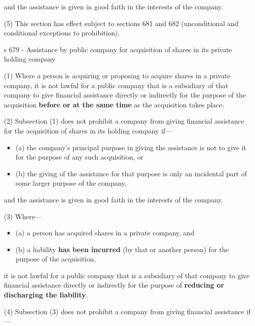 \documentclass[
]{article}
\providecommand{\tightlist}{%
  \setlength{\itemsep}{0pt}\setlength{\parskip}{0pt}}
\newenvironment{env-99ba4262-5297-4318-9547-86307715f49a}
{
    \savenotes\tcolorbox[blanker,breakable,left=5pt,borderline west={2pt}{-4pt}{green}]
}
{
    \endtcolorbox\spewnotes
}
\begin{document}
\begin{env-99ba4262-5297-4318-9547-86307715f49a}
and the assistance is given in good faith in the interests of the
company.

(5) This section has effect subject to sections 681 and 682
(unconditional and conditional exceptions to prohibition).

\end{env-99ba4262-5297-4318-9547-86307715f49a}

\begin{env-99ba4262-5297-4318-9547-86307715f49a}

s 679 - Assistance by public company for acquisition of shares in its
private holding company

(1) Where a person is acquiring or proposing to acquire shares in a
private company, it is not lawful for a public company that is a
subsidiary of that company to give financial assistance directly or
indirectly for the purpose of the acquisition \textbf{before or at the
same time} as the acquisition takes place.

(2) Subsection (1) does not prohibit a company from giving financial
assistance for the acquisition of shares in its holding company if---

\begin{itemize}
\tightlist
\item
  (a) the company's principal purpose in giving the assistance is not to
  give it for the purpose of any such acquisition, or
\item
  (b) the giving of the assistance for that purpose is only an
  incidental part of some larger purpose of the company,
\end{itemize}

and the assistance is given in good faith in the interests of the
company.

(3) Where---

\begin{itemize}
\tightlist
\item
  (a) a person has acquired shares in a private company, and
\item
  (b) a liability \textbf{has been incurred} (by that or another person)
  for the purpose of the acquisition,
\end{itemize}

it is not lawful for a public company that is a subsidiary of that
company to give financial assistance directly or indirectly for the
purpose of \textbf{reducing or discharging the liability}.

(4) Subsection (3) does not prohibit a company from giving financial
assistance if---


\end{env-99ba4262-5297-4318-9547-86307715f49a}
\end{document}
